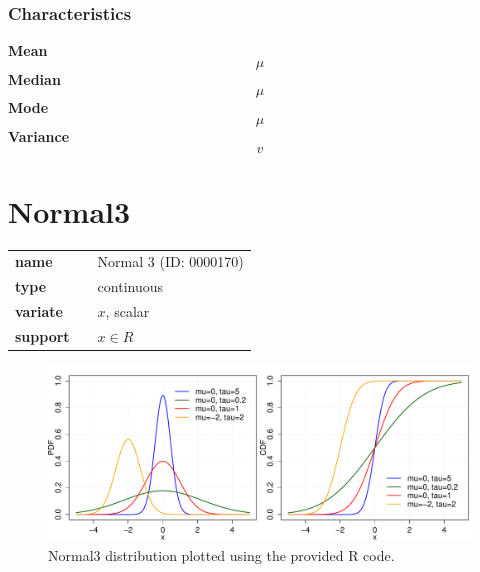 \subsubsection*{Characteristics}
\smallskip \noindent \hspace{.2cm} \textbf{Mean} 
\begin{equation*}\mu\end{equation*}
\smallskip \noindent \hspace{.2cm} \textbf{Median} 
\begin{equation*}\mu\end{equation*}
\smallskip \noindent \hspace{.2cm} \textbf{Mode} 
\begin{equation*}\mu\end{equation*}
\smallskip \noindent \hspace{.2cm} \textbf{Variance} 
\begin{equation*}v\end{equation*}
\smallskip
\section*{Normal3} 

  \bigskip 

\begin{tabular}{p{2cm}cl}
\textbf{name} & & Normal 3 (ID: 0000170)\\ 
 
\textbf{type} & & continuous \\ 

\textbf{variate} & & $x$, scalar \\ 

\textbf{support} & & $x \in R$
\end{tabular}

\begin{figure}[ht!]
\centering
  \includegraphics[width=140mm]{pics/Normal3.pdf}
 \caption{Normal3 distribution plotted using the provided R code.}
 \label{fig:Normal3}
\end{figure}

